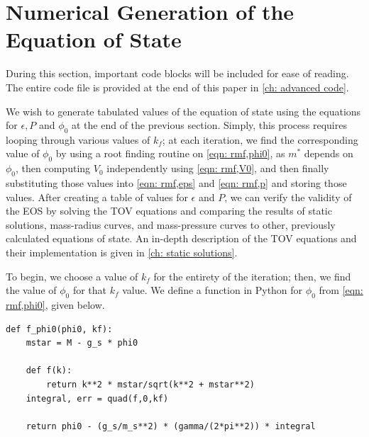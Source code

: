 


\section{Numerical Generation of the Equation of State}

During this section, important code blocks will be included for ease of reading. The entire code file is provided at the end of this paper in \autoref{ch: advanced code}.

We wish to generate tabulated values of the equation of state using the equations for $\epsilon, P$ and $\phi_0$ at the end of the previous section. Simply, this process requires looping through various values of $k_f$; at each iteration, we find the corresponding value of $\phi_0$ by using a root finding routine on \eqref{eqn: rmf,phi0}, as $m^*$ depends on $\phi_0$, then computing $V_0$ independently using \eqref{eqn: rmf,V0}, and then finally substituting those values into \eqref{eqn: rmf,eps} and \eqref{eqn: rmf,p} and storing those values. After creating a table of values for $\epsilon$ and $P$, we can verify the validity of the EOS by solving the TOV equations and comparing the results of static solutions, mass-radius curves, and mass-pressure curves to other, previously calculated equations of state. An in-depth description of the TOV equations and their implementation is given in \autoref{ch: static solutions}.

To begin, we choose a value of $k_f$ for the entirety of the iteration; then, we find the value of $\phi_0$ for that $k_f$ value. We define a function in Python for $\phi_0$ from \eqref{eqn: rmf,phi0}, given below.

\begin{lstlisting}
def f_phi0(phi0, kf):
    mstar = M - g_s * phi0

    def f(k):
        return k**2 * mstar/sqrt(k**2 + mstar**2)
    integral, err = quad(f,0,kf)

    return phi0 - (g_s/m_s**2) * (gamma/(2*pi**2)) * integral
\end{lstlisting}

